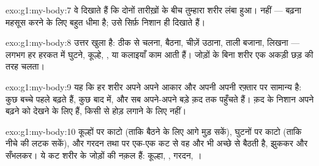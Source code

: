 \begin{solution}{exo:g1:my-body:7}
वे दिखाते हैं कि दोनों तारीख़ों के बीच तुम्हारा शरीर लंबा हुआ। नहीं
--- बढ़ना महसूस करने के लिए बहुत धीमा है; उसे सिर्फ़ निशान ही दिखाते
हैं।
\end{solution}

\begin{solution}{exo:g1:my-body:8}
उत्तर खुला है: ठीक से चलना, बैठना, चीज़ें उठाना, ताली बजाना, लिखना ---
लगभग हर हरकत में घुटने, कूल्हे, ,  या कलाइयाँ काम आती
हैं। जोड़ों के बिना शरीर एक अकड़ी छड़ की तरह चलता।
\end{solution}

\begin{solution}{exo:g1:my-body:9}
यह कि हर शरीर अपने अपने आकार और अपनी अपनी रफ़्तार पर सामान्य है: कुछ
बच्चे पहले बढ़ते हैं, कुछ बाद में, और सब अपने-अपने बड़े क़द तक पहुँचते
हैं। क़द के निशान अपने बढ़ने को देखने के लिए हैं, किसी से होड़ लगाने के
लिए नहीं।
\end{solution}

\begin{solution}{exo:g1:my-body:10}
कूल्हों पर काटो (ताकि  बैठने के लिए आगे मुड़ सकें), घुटनों पर
काटो (ताकि नीचे की  लटक सकें), और गरदन तथा  पर एक-एक कट से
वह और भी अच्छे से बैठती है, झुककर और सँभलकर। ये कट शरीर के जोड़ों की
नक़ल हैं: कूल्हा, , गरदन, ।
\end{solution}
